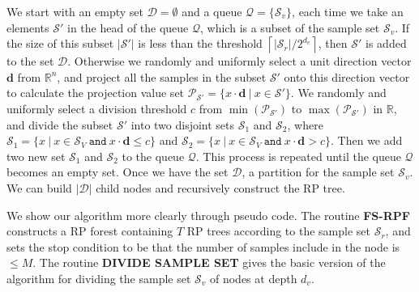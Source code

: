 We start with an empty set $\mathcal{D}=\emptyset$ and a queue $\mathcal{Q}=\{\mathcal{S}_v\}$, each time we take an elements $\mathcal{S}'$ in the head of the queue $\mathcal{Q}$, which is a subset of the sample set $\mathcal{S}_v$. If the size of this subset $|\mathcal{S}'|$ is less than the threshold $\left\lceil|\mathcal{S}_r|/2^{d_v}\right\rceil$, then $\mathcal{S}'$ is added to the set $\mathcal{D}$.
Otherwise we randomly and uniformly select a unit direction vector $\mathbf{d}$ from $\mathbb{R}^n$, and project all the samples in the subset $\mathcal{S}'$ onto this direction vector to calculate the projection value set $\mathcal{P_{S'}}=\{x\cdot\mathbf{d}~|~x\in\mathcal{S}'\}$. We randomly and uniformly select a division threshold $c$ from $\min(\mathcal{P_{S'}})$ to $\max(\mathcal{P_{S'}})$ in $\mathbb{R}$, and divide the subset $\mathcal{S}'$ into two disjoint sets $\mathcal{S}_1$ and $\mathcal{S}_2$, where $\mathcal{S}_1=\{x~|~x\in\mathcal{S}_V~\texttt{and}~x\cdot\mathbf{d}\leqslant c\}$ and $\mathcal{S}_2=\{x~|~x\in\mathcal{S}_V~\texttt{and}~x\cdot\mathbf{d}>c\}$. 
Then we add two new set $\mathcal{S}_1$ and $\mathcal{S}_2$ to the queue $\mathcal{Q}$. This process is repeated until the queue $\mathcal{Q}$ becomes an empty set.
Once we have the set $\mathcal{D}$, a partition for the sample set $\mathcal{S}_v$. We can build $|\mathcal{D}|$ child nodes and recursively construct the RP tree.

We show our algorithm more clearly through pseudo code. The routine \textbf{FS-RPF} constructs a RP forest containing $T$ RP trees according to the sample set $\mathcal{S}_r$, and sets the stop condition to be that the number of samples include in the node is $\leqslant M$. The routine \textbf{DIVIDE SAMPLE SET} gives the basic version of the algorithm for dividing the sample set $\mathcal{S}_v$ of nodes at depth $d_v$.


